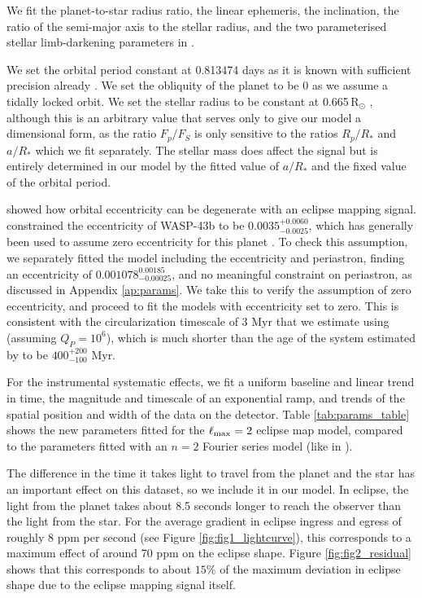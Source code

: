 \documentclass[twocolumn]{aastex631}
\begin{document}
We fit the planet-to-star radius ratio, the linear ephemeris, the inclination, the ratio of the semi-major axis to the stellar radius, and the two parameterised stellar limb-darkening parameters in \citet{kipping2013efficient}. 


We set the orbital period constant at 0.813474 days as it is known with sufficient precision already \citep{kokori2023exoclock}. We set the obliquity of the planet to be 0 as we assume a tidally locked orbit. We set the stellar radius to be constant at 0.665\,R$_{\odot}$ \citep{bell2023wasp43b}, although this is an arbitrary value that serves only to give our model a dimensional form, as the ratio $F_{p}/F_{S}$ is only sensitive to the ratios $R_{p}/R_{*}$ and $a/R_{*}$ which we fit separately. The stellar mass does affect the signal \citep{de2012towards} but is entirely determined in our model by the fitted value of $a/R_{*}$ and the fixed value of the orbital period. 

\citet{de2012towards} showed how orbital eccentricity can be degenerate with an eclipse mapping signal. \citet{gillon2012trappist} constrained the eccentricity of WASP-43b to be $0.0035_{-0.0025}^{+0.0060}$, which has generally been used to assume zero eccentricity for this planet \citep{bell2023wasp43b}. To check this assumption, we separately fitted the model including the eccentricity and periastron, finding an eccentricity of $0.001078_{-0.00025}^{0.00185}$, and no meaningful constraint on periastron, as discussed in Appendix \ref{ap:params}. We take this to verify the assumption of zero eccentricity, and proceed to fit the models with eccentricity set to zero. This is consistent with the circularization timescale of 3 Myr that we estimate using \citet{adams2006long} (assuming $Q_{P}=10^{6}$), which is much shorter than the age of the system estimated by \citet{hellier2011wasp} to be $400^{+200}_{-100}$ Myr.

For the instrumental systematic effects, we fit a uniform baseline and linear trend in time, the magnitude and timescale of an exponential ramp, and trends of the spatial position and width of the data on the detector. Table \ref{tab:params_table} shows the new parameters fitted for the $\ell_{\rm max}=2$ eclipse map model, compared to the parameters fitted with an $n=2$ Fourier series model (like in \citet{bell2023wasp43b}).

The difference in the time it takes light to travel from the planet and the star has an important effect on this dataset, so we include it in our model. In eclipse, the light from the planet takes about 8.5 seconds longer to reach the observer than the light from the star. For the average gradient in eclipse ingress and egress of roughly 8 ppm per second (see Figure \ref{fig:fig1_lightcurve}), this corresponds to a maximum effect of around 70 ppm on the eclipse shape. Figure \ref{fig:fig2_residual} shows that this corresponds to about $15\%$ of the maximum deviation in eclipse shape due to the eclipse mapping signal itself.
\end{document}

